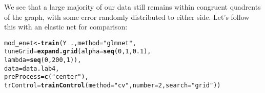 \documentclass[12pt]{article}\usepackage[]{graphicx}\usepackage[]{color}
\makeatletter
\newcommand{\hlnum}[1]{\textcolor[rgb]{0.686,0.059,0.569}{#1}}%
\newcommand{\hlstr}[1]{\textcolor[rgb]{0.192,0.494,0.8}{#1}}%
\newcommand{\hlopt}[1]{\textcolor[rgb]{0,0,0}{#1}}%
\newcommand{\hlstd}[1]{\textcolor[rgb]{0.345,0.345,0.345}{#1}}%
\newcommand{\hlkwb}[1]{\textcolor[rgb]{0.69,0.353,0.396}{#1}}%
\newcommand{\hlkwc}[1]{\textcolor[rgb]{0.333,0.667,0.333}{#1}}%
\newcommand{\hlkwd}[1]{\textcolor[rgb]{0.737,0.353,0.396}{\textbf{#1}}}%
\newenvironment{kframe}{%
 \def\at@end@of@kframe{}%
 \ifinner\ifhmode%
  \def\at@end@of@kframe{\end{minipage}}%
  \begin{minipage}{\columnwidth}%
 \fi\fi%
 \def\FrameCommand##1{\hskip\@totalleftmargin \hskip-\fboxsep
 \colorbox{shadecolor}{##1}\hskip-\fboxsep
     \hskip-\linewidth \hskip-\@totalleftmargin \hskip\columnwidth}%
 \MakeFramed {\advance\hsize-\width
   \@totalleftmargin\z@ \linewidth\hsize
   \@setminipage}}%
 {\par\unskip\endMakeFramed%
 \at@end@of@kframe}
\newenvironment{knitrout}{}{} %
\makeatother
\begin{document}
\begin{flushleft}
\begin{centering}
\begin{knitrout}
\end{knitrout}
\end{centering}

We see that a large majority of our data still remains within congruent quadrents of the graph, with some error randomly distributed to either side. Let's follow this with an elastic net for comparison:

\begin{centering}
\begin{knitrout}
\color{fgcolor}\begin{kframe}
\begin{alltt}
\hlstd{mod_enet} \hlkwb{<-} \hlkwd{train}\hlstd{(Y}\hlopt{~}\hlstd{.,} \hlkwc{method}\hlstd{=}\hlstr{"glmnet"}\hlstd{,}
                 \hlkwc{tuneGrid}\hlstd{=}\hlkwd{expand.grid}\hlstd{(}\hlkwc{alpha}\hlstd{=}\hlkwd{seq}\hlstd{(}\hlnum{0}\hlstd{,}\hlnum{1}\hlstd{,}\hlnum{0.1}\hlstd{),}
                                      \hlkwc{lambda}\hlstd{=}\hlkwd{seq}\hlstd{(}\hlnum{0}\hlstd{,}\hlnum{200}\hlstd{,}\hlnum{1}\hlstd{)),}
                 \hlkwc{data}\hlstd{=data.lab4,}
                 \hlkwc{preProcess}\hlstd{=}\hlkwd{c}\hlstd{(}\hlstr{"center"}\hlstd{),}
                 \hlkwc{trControl}\hlstd{=}\hlkwd{trainControl}\hlstd{(}\hlkwc{method}\hlstd{=}\hlstr{"cv"}\hlstd{,}\hlkwc{number}\hlstd{=}\hlnum{2}\hlstd{,} \hlkwc{search}\hlstd{=}\hlstr{"grid"}\hlstd{))}



\end{alltt}
\end{kframe}
\end{knitrout}
\end{centering}
\end{flushleft}
\end{document}

